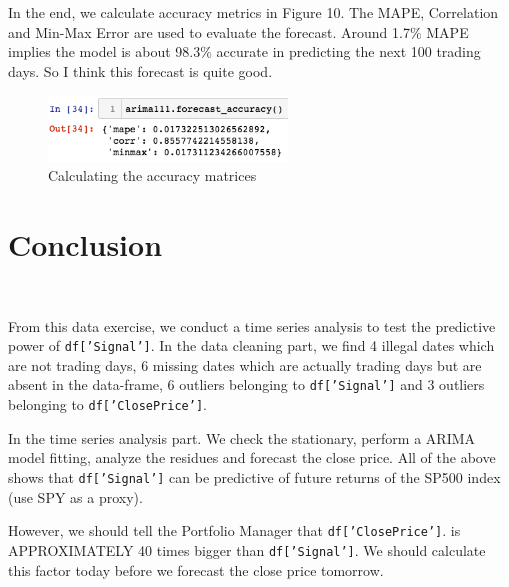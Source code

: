 \documentclass[11pt, oneside]{article}   	%
\begin{document}
In the end, we calculate accuracy metrics in Figure 10. The MAPE, Correlation and Min-Max Error are used to evaluate the forecast. Around 1.7$\%$ MAPE implies the model is about 98.3$\%$ accurate in predicting the next 100 trading days. So I think this forecast is quite good.
\begin{figure}[htbp]
   \centering
   \includegraphics[width = 2.5in]{am.png} 
       \caption{Calculating the accuracy matrices}
\end{figure}


\section{Conclusion}

\

From this data exercise, we conduct a time series analysis to test the predictive power of \texttt{df['Signal']}. In the data cleaning part, we find  4 illegal dates which are not trading days, 6 missing dates which are actually trading days but are absent in the data-frame, 6 outliers belonging to \texttt{df['Signal']} and 3 outliers belonging to \texttt{df['ClosePrice']}.

In the time series analysis part. We check the stationary, perform a ARIMA model fitting, analyze the residues and forecast the close price. All of the above shows that \texttt{df['Signal']}  can be predictive of future returns of the SP500 index (use SPY as a proxy).

However, we should tell the Portfolio Manager that \texttt{df['ClosePrice']}. is  APPROXIMATELY 40 times bigger than \texttt{df['Signal']}. We should calculate this factor today before we forecast the close price tomorrow.
\end{document}
